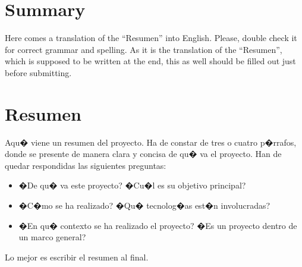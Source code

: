 \documentclass[a4paper, 12pt]{book}
\begin{document}

\chapter*{Summary}

Here comes a translation of the ``Resumen'' into English. Please, double check
it for correct grammar and spelling. As it is the translation of the ``Resumen'',
which is supposed to be written at the end, this as well should be filled out
just before submitting.



\chapter*{Resumen}

Aqu� viene un resumen del proyecto. Ha de constar de tres o cuatro p�rrafos,
donde se presente de manera clara y concisa de qu� va el proyecto. Han
de quedar respondidas las siguientes preguntas:

\begin{itemize}
  \item �De qu� va este proyecto? �Cu�l es su objetivo principal?
  \item �C�mo se ha realizado? �Qu� tecnolog�as est�n involucradas?
  \item �En qu� contexto se ha realizado el proyecto? �Es un proyecto
dentro de un marco general?
\end{itemize}

Lo mejor es escribir el resumen al final.





\end{document}
